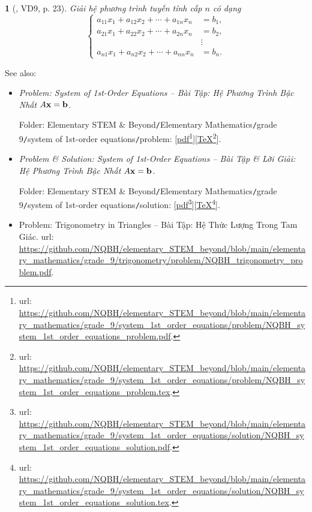 \documentclass{article}
\newtheorem{baitoan}{}
\begin{document}
\begin{baitoan}[\cite{Doanh_Tuan_Pascal}, VD9, p. 23]
	Giải hệ phương trình tuyến tính cấp $n$ có dạng
	\begin{equation}
		\left\{\begin{split}
			a_{11}x_1 + a_{12}x_2 + \cdots + a_{1n}x_n &= b_1,\\
			a_{21}x_1 + a_{22}x_2 + \cdots + a_{2n}x_n &= b_2,\\
			&\vdots\\
			a_{n1}x_1 + a_{n2}x_2 + \cdots + a_{nn}x_n &= b_n.
		\end{split}\right.
	\end{equation}
\end{baitoan}
See also:
\begin{itemize}
	\item {\it Problem: System of 1st-Order Equations -- Bài Tập: Hệ Phương Trình Bậc Nhất $A{\bf x} = {\bf b}$}.
	
	Folder: {\sf Elementary STEM \& Beyond{\tt/}Elementary Mathematics{\tt/}grade 9{\tt/}system of 1st-order equations{\tt/}problem}: [\href{https://github.com/NQBH/elementary_STEM_beyond/blob/main/elementary_mathematics/grade_9/system_1st_order_equations/problem/NQBH_system_1st_order_equations_problem.pdf}{pdf}\footnote{{\sc url}: \url{https://github.com/NQBH/elementary_STEM_beyond/blob/main/elementary_mathematics/grade_9/system_1st_order_equations/problem/NQBH_system_1st_order_equations_problem.pdf}.}][\href{https://github.com/NQBH/elementary_STEM_beyond/blob/main/elementary_mathematics/grade_9/system_1st_order_equations/problem/NQBH_system_1st_order_equations_problem.tex}{\TeX}\footnote{{\sc url}: \url{https://github.com/NQBH/elementary_STEM_beyond/blob/main/elementary_mathematics/grade_9/system_1st_order_equations/problem/NQBH_system_1st_order_equations_problem.tex}.}].
	\item {\it Problem \& Solution: System of 1st-Order Equations -- Bài Tập \& Lời Giải: Hệ Phương Trình Bậc Nhất $A{\bf x} = {\bf b}$}.
	
	Folder: {\sf Elementary STEM \& Beyond{\tt/}Elementary Mathematics{\tt/}grade 9{\tt/}system of 1st-order equations{\tt/}solution}: [\href{https://github.com/NQBH/elementary_STEM_beyond/blob/main/elementary_mathematics/grade_9/system_1st_order_equations/solution/NQBH_system_1st_order_equations_solution.pdf}{pdf}\footnote{{\sc url}: \url{https://github.com/NQBH/elementary_STEM_beyond/blob/main/elementary_mathematics/grade_9/system_1st_order_equations/solution/NQBH_system_1st_order_equations_solution.pdf}.}][\href{https://github.com/NQBH/elementary_STEM_beyond/blob/main/elementary_mathematics/grade_9/system_1st_order_equations/solution/NQBH_system_1st_order_equations_solution.tex}{\TeX}\footnote{{\sc url}: \url{https://github.com/NQBH/elementary_STEM_beyond/blob/main/elementary_mathematics/grade_9/system_1st_order_equations/solution/NQBH_system_1st_order_equations_solution.tex}.}].
	\item Problem: Trigonometry in Triangles -- Bài Tập: Hệ Thức Lượng Trong Tam Giác. {\sc url}: \url{https://github.com/NQBH/elementary_STEM_beyond/blob/main/elementary_mathematics/grade_9/trigonometry/problem/NQBH_trigonometry_problem.pdf}.
\end{itemize}
\end{document}
